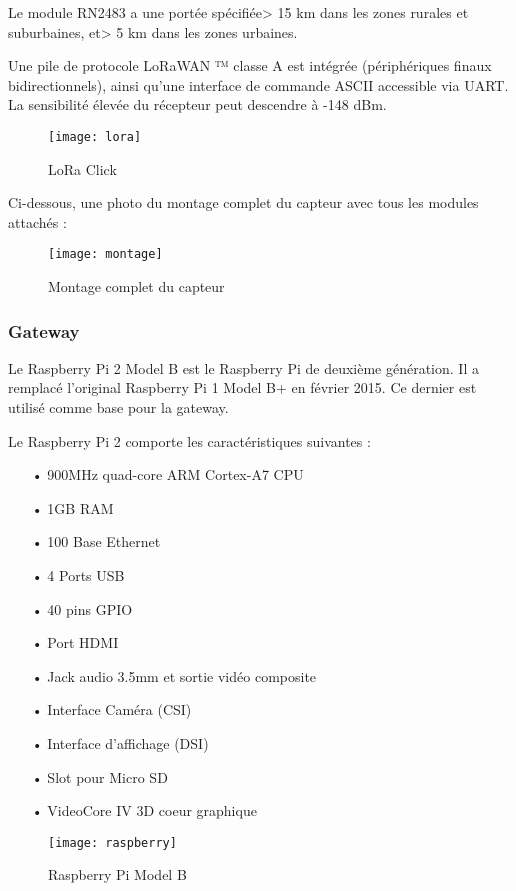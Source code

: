 Le module RN2483 a une portée spécifiée> 15 km dans les zones rurales et suburbaines, et> 5 km dans les zones urbaines.

Une pile de protocole LoRaWAN ™ classe A est intégrée (périphériques finaux bidirectionnels), ainsi qu'une interface de commande ASCII accessible via UART. La sensibilité élevée du récepteur peut descendre à -148 dBm.
\begin{figure}[!h]
	\centering
	\texttt{[image: lora]}
	\caption{LoRa Click}
	\label{lora}
\end{figure}

Ci-dessous, une photo du montage complet du capteur avec tous les modules attachés :
\vspace{3mm}
\begin{figure}[!h]
	\centering
	\texttt{[image: montage]}
	\caption{Montage complet du capteur}
	\label{}
\end{figure}

\newpage
\subsubsection{Gateway}

Le Raspberry Pi 2 Model B est le Raspberry Pi de deuxième génération. Il a remplacé l'original Raspberry Pi 1 Model B+ en février 2015. Ce dernier est utilisé comme base pour la gateway.

Le Raspberry Pi 2 comporte les caractéristiques suivantes :

\begin{itemize}
	\item[•] 900MHz quad-core ARM Cortex-A7 CPU
	\item[•] 1GB RAM
	\item[•] 100 Base Ethernet
	\item[•] 4 Ports USB
	\item[•] 40 pins GPIO
	\item[•] Port HDMI
	\item[•] Jack audio 3.5mm et sortie vidéo composite
	\item[•] Interface Caméra (CSI)
	\item[•] Interface d'affichage (DSI)
	\item[•] Slot pour Micro SD
	\item[•] VideoCore IV 3D coeur graphique
\end{itemize}



\begin{figure}[!h]
	\centering
	\texttt{[image: raspberry]}
	\caption{Raspberry Pi Model B}
	\label{raspberry}
\end{figure}

